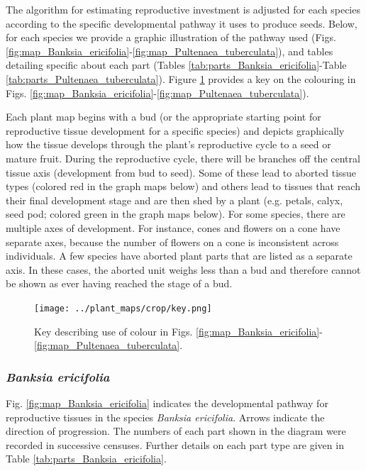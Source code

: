 \documentclass[10pt,twoside]{article}\usepackage[]{graphicx}\usepackage[]{color}
\begin{document}
The algorithm for estimating reproductive investment is adjusted for each species according to the specific developmental pathway it uses to produce seeds. Below, for each species we provide a graphic illustration of the pathway used (Figs. \ref{fig:map_Banksia_ericifolia}-\ref{fig:map_Pultenaea_tuberculata}), and tables detailing specific about each part (Tables \ref{tab:parts_Banksia_ericifolia}-Table \ref{tab:parts_Pultenaea_tuberculata}).  Figure \ref{fig:map_key} provides a key on the colouring in Figs. \ref{fig:map_Banksia_ericifolia}-\ref{fig:map_Pultenaea_tuberculata}).

Each plant map begins with a bud (or the appropriate starting point for reproductive tissue development for a specific species) and depicts graphically how the tissue develops through the plant's reproductive cycle to a seed or mature fruit. During the reproductive cycle, there will be branches off the central tissue axis (development from bud to seed). Some of these lead to aborted tissue types (colored red in the graph maps below) and others lead to tissues that reach their final development stage and are then shed by a plant (e.g. petals, calyx, seed pod; colored green in the graph maps below). For some species, there are multiple axes of development. For instance, cones and flowers on a cone have separate axes, because the number of flowers on a cone is inconsistent across individuals. A few species have aborted plant parts that are listed as a separate axis. In these cases, the aborted unit weighs less than a bud and therefore cannot be shown as ever having reached the stage of a bud.

\begin{figure}[h]
\centering
\texttt{[image: ../plant\_maps/crop/key.png]}
\caption{Key describing use of colour in Figs. \ref{fig:map_Banksia_ericifolia}-\ref{fig:map_Pultenaea_tuberculata}.}
\label{fig:map_key}
\end{figure}
\clearpage

\subsubsection{\emph{Banksia ericifolia}}

Fig. \ref{fig:map_Banksia_ericifolia} indicates the developmental pathway for reproductive tissues in the species \emph{Banksia ericifolia}. Arrows indicate the direction of progression.  The numbers of each part shown in the diagram were recorded in successive censuses. Further details on each part type are given in Table \ref{tab:parts_Banksia_ericifolia}.
\end{document}
